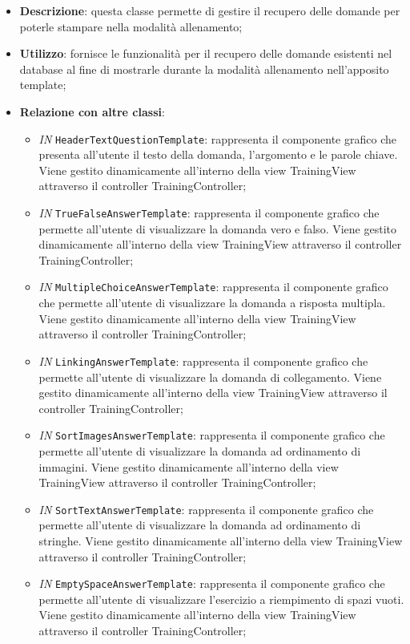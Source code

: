 \begin{itemize}
	\item \textbf{Descrizione}: questa classe permette di gestire il recupero delle domande per poterle stampare nella modalità allenamento;
	\item \textbf{Utilizzo}: fornisce le funzionalità per il recupero delle domande esistenti nel database al fine di mostrarle durante la modalità allenamento nell'apposito template;
	\item \textbf{Relazione con altre classi}:
	\begin{itemize}
		\item \textit{IN} \texttt{HeaderTextQuestionTemplate}: rappresenta il componente grafico che presenta all'utente il testo della domanda, l'argomento e le parole chiave. Viene gestito dinamicamente all'interno della view TrainingView attraverso il controller TrainingController; 
		\item \textit{IN} \texttt{TrueFalseAnswerTemplate}: rappresenta il componente grafico che permette all'utente di visualizzare la domanda vero e falso. Viene gestito dinamicamente all'interno della view TrainingView attraverso il controller TrainingController; 
		\item \textit{IN} \texttt{MultipleChoiceAnswerTemplate}: rappresenta il componente grafico che permette all'utente di visualizzare la domanda a risposta multipla. Viene gestito dinamicamente all'interno della view TrainingView attraverso il controller TrainingController; 
		\item \textit{IN} \texttt{LinkingAnswerTemplate}: rappresenta il componente grafico che permette all'utente di visualizzare la domanda di collegamento. Viene gestito dinamicamente all'interno della view TrainingView attraverso il controller TrainingController; 
		\item \textit{IN} \texttt{SortImagesAnswerTemplate}: rappresenta il componente grafico che permette all'utente di visualizzare la domanda ad ordinamento di immagini. Viene gestito dinamicamente all'interno della view TrainingView attraverso il controller TrainingController; 
		\item \textit{IN} \texttt{SortTextAnswerTemplate}: rappresenta il componente grafico che permette all'utente di visualizzare la domanda ad ordinamento di stringhe. Viene gestito dinamicamente all'interno della view TrainingView attraverso il controller TrainingController; 
		\item \textit{IN} \texttt{EmptySpaceAnswerTemplate}: rappresenta il componente grafico che permette all'utente di visualizzare l'esercizio a riempimento di spazi vuoti. Viene gestito dinamicamente all'interno della view TrainingView attraverso il controller TrainingController; 

\end{itemize}
\end{itemize}
